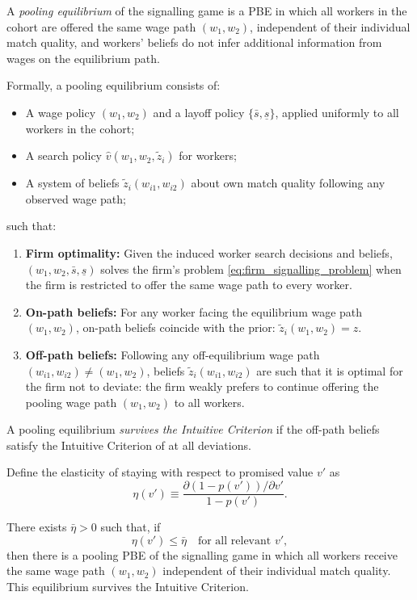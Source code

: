 \begin{definition}
A \emph{pooling equilibrium} of the signalling game is a PBE in which all workers in the cohort are offered the same wage path $(w_1,w_2)$, independent of their individual match quality, and workers' beliefs do not infer additional information from wages on the equilibrium path.

Formally, a pooling equilibrium consists of:
\begin{itemize}
    \item A wage policy $(w_1,w_2)$ and a layoff policy $\{ \bar{s},\underline{s} \}$, applied uniformly to all workers in the cohort;
    \item A search policy $\hat{v}(w_1,w_2,\tilde{z}_i)$ for workers;
    \item A system of beliefs $\tilde{z}_i(w_{i1},w_{i2})$ about own match quality following any observed wage path;
\end{itemize}
such that:
\begin{enumerate}
    \item \textbf{Firm optimality:} Given the induced worker search decisions and beliefs, $(w_1,w_2,\bar{s},\underline{s})$ solves the firm’s problem \eqref{eq:firm_signalling_problem} when the firm is restricted to offer the same wage path to every worker.
    \item \textbf{On-path beliefs:} For any worker facing the equilibrium wage path $(w_1,w_2)$, on-path beliefs coincide with the prior: $\tilde{z}_i(w_1,w_2) = z$.
    \item \textbf{Off-path beliefs:} Following any off-equilibrium wage path $(w_{i1},w_{i2}) \neq (w_1,w_2)$, beliefs $\tilde{z}_i(w_{i1},w_{i2})$ are such that it is optimal for the firm not to deviate: the firm weakly prefers to continue offering the pooling wage path $(w_1,w_2)$ to all workers.
\end{enumerate}
A pooling equilibrium \emph{survives the Intuitive Criterion} if the off-path beliefs satisfy the Intuitive Criterion of \textcite{Cho1987} at all deviations.
\end{definition}

Define the elasticity of staying with respect to promised value $v'$ as
\[
\eta(v') \equiv 
\frac{\partial (1-p(v'))/\partial v'}{1-p(v')}.
\]

\begin{proposition}
\label{prop:pooling_signalling}
There exists $\bar{\eta} > 0$ such that, if 
\[
\eta(v') \leq \bar{\eta}
\quad \text{for all relevant } v',
\]
then there is a pooling PBE of the signalling game in which all workers receive the same wage path $(w_1,w_2)$ independent of their individual match quality. This equilibrium survives the Intuitive Criterion.
\end{proposition}

